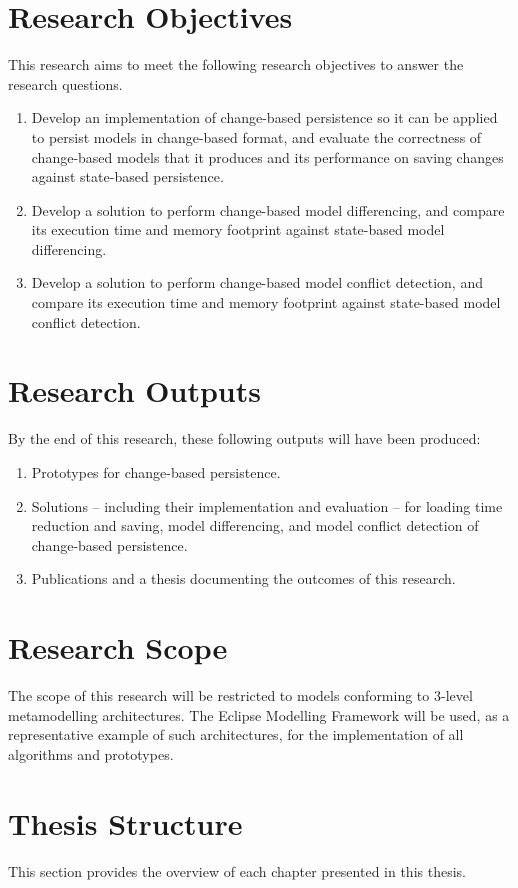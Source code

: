 \section{Research Objectives}
\label{sec:research_objectives}
This research aims to meet the following research objectives to answer the research questions.
\begin{enumerate}
\item Develop an implementation of change-based persistence so it can be applied to persist models in change-based format, and evaluate the correctness of change-based models that it produces and its performance on saving changes against state-based persistence. 
\item Develop a solution to perform change-based model differencing, and compare its execution time and memory footprint against state-based model differencing.
\item Develop a solution to perform change-based model conflict detection, and compare its execution time and memory footprint against state-based model conflict detection.
\end{enumerate}

\section{Research Outputs}
\label{sec:research_outputs}
By the end of this research, these following outputs will have been produced:
\begin{enumerate}
\item Prototypes for change-based persistence. 
\item Solutions -- including their implementation and evaluation -- for loading time reduction and saving, model differencing, and model conflict detection of change-based persistence.
\item Publications and a thesis documenting the outcomes of this research.
\end{enumerate}

\section{Research Scope}
\label{sec:research_scope}
The scope of this research will be restricted to models conforming to 3-level metamodelling architectures. The Eclipse Modelling Framework will be used, as a representative example of such architectures, for the implementation of all algorithms and prototypes.

\section{Thesis Structure}
\label{sec:Thesis Structure}
This section provides the overview of each chapter presented in this thesis.

